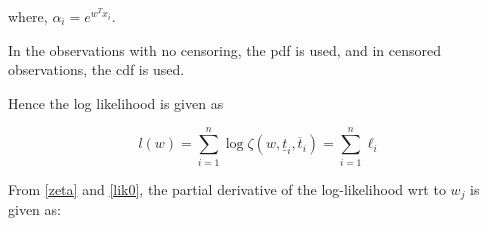 \documentclass[12pt,a4paper]{report}
\begin{document}
where, $\alpha_i = e^{w^Tx_i}$. %

In the observations with no censoring, the pdf is used, and in censored observations,
the cdf is used.





Hence the log likelihood is given as

\begin{equation} \label{lik0}
l(w) = \sum_{i=1}^n \log \zeta(w, \underline t_i, \overline t_i) = \sum_{i=1}^n \ell_i %
\end{equation}

From \ref{zeta} and \ref{lik0}, the partial derivative of the log-likelihood wrt to $w_j$ is given as:
\end{document}
